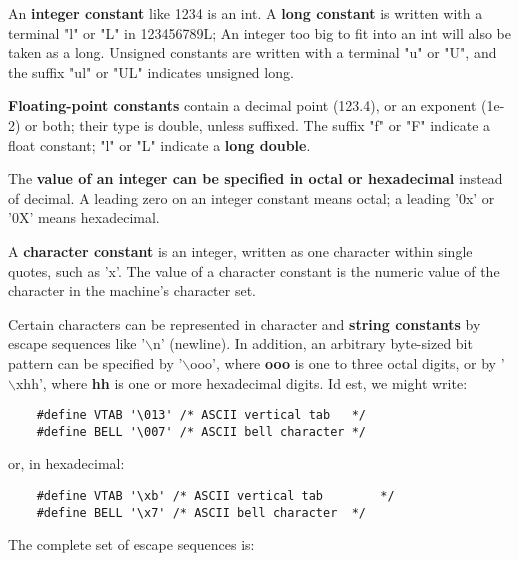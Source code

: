 \documentclass{article}
\begin{document}
An \textbf{integer constant} like 1234 is an int. 
A \textbf{long constant} is written with a terminal "l" or "L" in 123456789L; An integer too big to fit into an int will also be taken as a long. Unsigned constants are written with a terminal "u" or "U", and the suffix "ul" or "UL" indicates unsigned long.

\textbf{Floating-point constants} contain a decimal point (123.4), or an exponent (1e-2) or both; their type is double, unless suffixed. The suffix "f" or "F" indicate a float constant; "l" or "L" indicate a \textbf{long double}.

The \textbf{value of an integer can be specified in octal or hexadecimal} instead of decimal. A leading zero on an integer constant means octal; a leading '0x' or '0X' means hexadecimal.

A \textbf{character constant} is an integer, written as one character within single quotes, such as 'x'. The value of a character constant is the numeric value of the character in the machine's character set.

Certain characters can be represented in character and \textbf{string constants} by escape sequences like '$\backslash$n' (newline). In addition, an arbitrary byte-sized bit pattern can be specified by '$\backslash$ooo', where \textbf{ooo} is one to three octal digits, or by '$\backslash$xhh', where \textbf{hh} is one or more hexadecimal digits. Id est, we might write:

\begin{lstlisting}
	#define VTAB '\013' /* ASCII vertical tab 	*/
	#define BELL '\007' /* ASCII bell character	*/
\end{lstlisting}

or, in hexadecimal:

\begin{lstlisting}
	#define VTAB '\xb' /* ASCII vertical tab 		*/
	#define BELL '\x7' /* ASCII bell character	*/
\end{lstlisting}

The complete set of escape sequences is:
\end{document}
